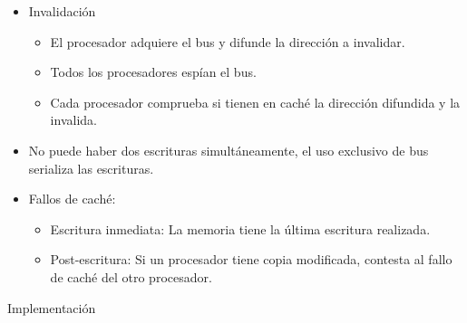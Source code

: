 \documentclass[12pt, twoside, openright]{report} %
\begin{document}
    \begin{itemize}
    
    \item
      Invalidación

      \begin{itemize}
      
      \item
        El procesador adquiere el bus y difunde la dirección a
        invalidar.
      \item
        Todos los procesadores espían el bus.
      \item
        Cada procesador comprueba si tienen en caché la dirección
        difundida y la invalida.
      \end{itemize}
    \item
      No puede haber dos escrituras simultáneamente, el uso exclusivo
      de bus serializa las escrituras.
    \item
      Fallos de caché:

      \begin{itemize}
      
      \item
        Escritura inmediata: La memoria tiene la última escritura
        realizada.
      \item
        Post-escritura: Si un procesador tiene copia modificada,
        contesta al fallo de caché del otro procesador.
      \end{itemize}
    \end{itemize}

    Implementación
\end{document}
